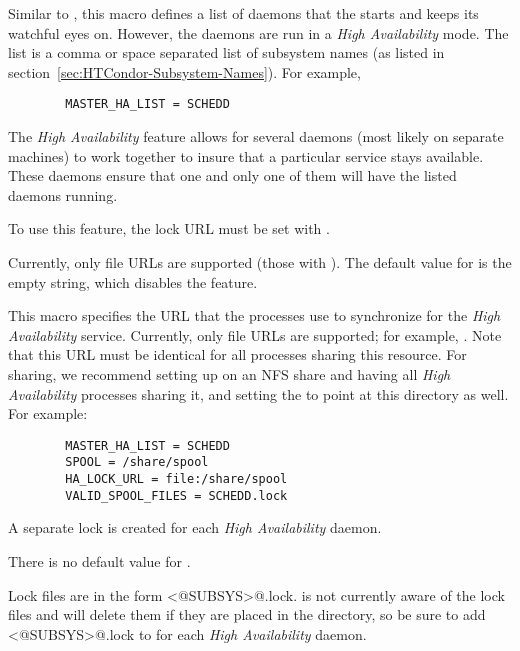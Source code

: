 \begin{description}
\label{param:MasterHAList}
\item[\Macro{MASTER\_HA\_LIST}]
  Similar to , this macro defines a list of daemons that
  the  starts and keeps its watchful eyes on.
  However, the  daemons are run in a
  \emph{High Availability} mode.
  The list is a comma or space separated list of subsystem names
  (as listed in section~\ref{sec:HTCondor-Subsystem-Names}).
  For example,
  \begin{verbatim}
        MASTER_HA_LIST = SCHEDD
  \end{verbatim}

  The \emph{High Availability} feature allows for several 
  daemons (most likely on separate machines) to work together to
  insure that a particular service stays available.  These
   daemons ensure that one and only one of them will
  have the listed daemons running.

  To use this feature, the lock URL must be set with
  .

  Currently, only file URLs are supported 
  (those with ).
  The default value for  is 
  the empty string, which disables the feature.
  
\label{param:HALockURL}
\item[\Macro{HA\_LOCK\_URL}]
  This macro specifies the URL that the  processes use to
  synchronize for the \emph{High Availability} service.
  Currently, only file URLs are supported; for example,
  .  Note that this URL must be identical
  for all  processes sharing this resource.  For
   sharing, we recommend setting up 
  on an NFS share and having all \emph{High Availability}
   processes sharing it,
  and setting the  to point at this directory
  as well.  For example:
\begin{verbatim}
        MASTER_HA_LIST = SCHEDD
        SPOOL = /share/spool
        HA_LOCK_URL = file:/share/spool
        VALID_SPOOL_FILES = SCHEDD.lock
\end{verbatim}

  A separate lock is created for each \emph{High Availability} daemon.

  There is no default value for .

  Lock files are in the form \verb@<@SUBSYS\verb@>@.lock.
   is not currently aware of the lock files and will
  delete them if they are placed in the  directory,
  so be sure to add \verb@<@SUBSYS\verb@>@.lock to 
   for each \emph{High Availability} daemon.


\end{description}
